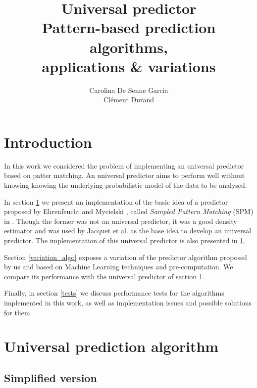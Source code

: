 \documentclass[a4paper,12pt]{article}
\title{%
  Universal predictor\\\small%
  Pattern-based prediction algorithms,\\%
  applications \& variations%
}
\author{%
  Carolina De Senne Garcia\\%
  Clément Durand%
}
\begin{document}
\maketitle

\vspace*{\fill}

\begin{abstract}
  \lipsum[1-2]
\end{abstract}

\vspace*{\fill}

\clearpage

\tableofcontents

\clearpage

\section*{Introduction}

In this work we considered the problem of implementing an universal predictor based on patter matching. An universal predictor aims to perform well without knowing knowing the underlying probabilistic model of the data to be analysed.

In section \ref{paper_algos} we present an implementation of the basic idea of a predictor proposed by Ehrenfeucht and Mycielski \cite{basic_algo}, called \textit{Sampled Pattern Matching} (SPM) in \cite{paper}. Though the former was not an universal predictor, it was a good density estimator and was used by Jacquet et al. \cite{paper} as the base idea to develop an universal predictor. The implementation of this universal predictor is also presented in \ref{paper_algos}.

Section \ref{variation_algo} exposes a variation of the predictor algorithm proposed by us and based on Machine Learning techniques and pre-computation. We compare its performance with the universal predictor of section \ref{paper_algos}.

Finally, in section \ref{tests} we discuss performance tests for the algorithms implemented in this work, as well as implementation issues and possible solutions for them.

\section{Universal prediction algorithm}\label{paper_algos}

  
  \subsection{Simplified version}
\end{document}
